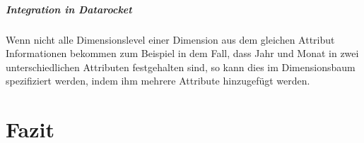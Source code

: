 \documentclass[
  language=german, %
  type=bachelor%
]{isthesis}
\begin{document}
\begin{content}
 \paragraph{Integration in \textit{Datarocket}}
 Wenn nicht alle Dimensionslevel einer Dimension aus dem gleichen Attribut
 Informationen bekommen zum Beispiel in dem Fall, dass Jahr und Monat in zwei
 unterschiedlichen Attributen festgehalten sind, so kann dies im Dimensionsbaum
 spezifiziert werden, indem ihm mehrere Attribute hinzugefügt werden.

  \begin{figure}[caption={\textit{DataRockets} \textit{Datapipeline}-Bausteine}, label={}]
  \end{figure}

\chapter{Fazit}



  

\end{content}



%  







\end{document}
